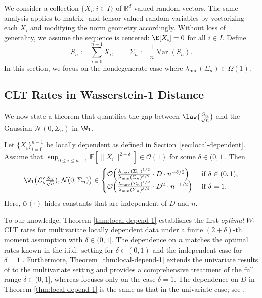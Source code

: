 \documentclass[mnsc,nonblindrev]{informs3}
\begin{document}
We consider a collection \(\{X_i : i \in I\}\) of \(\mathbb{R}^d\)-valued random vectors. The same analysis applies to matrix- and tensor-valued random variables by vectorizing each \(X_i\) and modifying the norm geometry accordingly. Without loss of generality, we assume the sequence is centered:
$\E[X_i]=0$ for all $i\in I$. Define
\[
S_n:=\sum_{i=0}^{n-1} X_i,
\qquad
\Sigma_n:=\frac{1}{n}\operatorname{Var}(S_n).
\]
In this section, we focus on the nondegenerate case  where
\(\lambda_{\min}(\Sigma_n) \in \Omega(1)\).

\subsection{CLT Rates in Wasserstein-1 Distance}\label{sec:depend-pequalto1}
We now state a theorem that quantifies the gap between
\(\law\big(\tfrac{S_n}{\sqrt{n}}\big)\) and the Gaussian  \(\mathcal N(0,\Sigma_n)\) in $\W_1$.

\begin{theorem}\label{thm:local-depend-1}
Let $\{X_i\}_{i=0}^{n-1}$ be locally dependent as defined in Section~\ref{sec:local-dependent}. Assume that  $\sup_{0\le i\le n-1}\mathbb{E}\left[\|X_i\|^{2+\delta}\right]\in \mathcal O(1)$ for some $\delta\in(0,1]$. Then
\[
\W_1\big(\mathcal{L}(\tfrac{S_n}{\sqrt{n}}),\mathcal{N}(0,\Sigma_n)\big)
\in\begin{cases}
\mathcal{O} \Big(\frac{\lambda_{\max}(\Sigma_n)^{1/2}}{\lambda_{\min}(\Sigma_n)^{\delta/2}}\cdot D\cdot n^{-\delta/2}\Big) & \text{ if } \delta \in (0,1),\\
\mathcal{O} \Big(\frac{\lambda_{\max}(\Sigma_n)^{1/2}}{\lambda_{\min}(\Sigma_n)^{3/2}}\cdot D^2\cdot n^{-1/2}\Big) & \text{ if } \delta=1.
\end{cases} 
\]
Here, $\mathcal{O}(\cdot)$ hides constants that are independent of $D$ and $n$.
\end{theorem}

To our knowledge, Theorem \ref{thm:local-depend-1} establishes  the first \emph{optimal} \(W_1\) CLT rates for
multivariate locally dependent data under a finite \((2+\delta)\)-th moment assumption with \(\delta\in(0,1]\). The dependence on $n$ matches the optimal rates known in the i.i.d.\ setting for $\delta\in(0,1)$ \citep{gallouet2018regularity} and the independent case for $\delta=1$ \citep{raivc2018multivariate}.
Furthermore, Theorem~\ref{thm:local-depend-1} extends the univariate results of
\cite{liu2023wasserstein} to the multivariate setting and provides a comprehensive treatment of the full range $\delta\in(0,1]$, whereas
\cite{liu2023wasserstein} focuses only on the case $\delta=1$. The dependence on \(D\) in Theorem \ref{thm:local-depend-1} is the same as that in the univariate case; see \cite{barbour1989central,liu2023wasserstein}.
\end{document}
